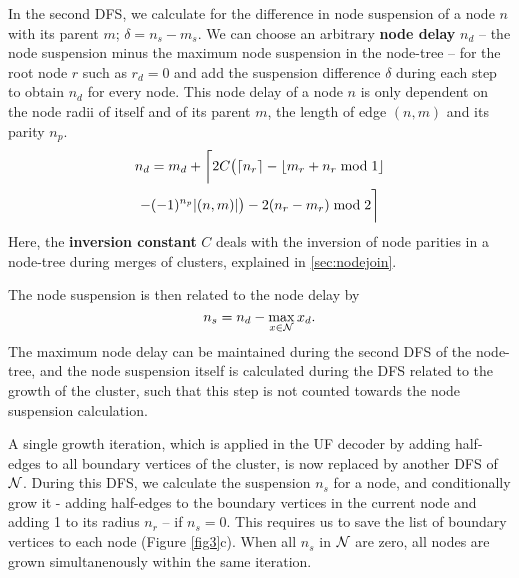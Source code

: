 In the second DFS, we calculate for the difference in node suspension of a node $n$ with its parent $m$; $\delta = n_s - m_s$. We can choose an arbitrary \textbf{node delay} $n_d$ -- the node suspension minus the maximum node suspension in the node-tree -- for the root node $r$ such as $r_d=0$ and add the suspension difference $\delta$ during each step to obtain $n_d$ for every node. This node delay of a node $n$ is only dependent on the node radii of itself and of its parent $m$, the length of edge $(n,m)$ and its parity $n_p$. 
\begin{multline}\label{eq:delayequation}
    n_d = m_d + \bigg \lceil 2C\big(\ceil{n_r} - \floor{m_r + n_r \bmod 1}\\
    - (-1)^{n_p}\abs{(n,m)}\big) - 2(n_r - m_r) \bmod2 \bigg \rceil
\end{multline}
Here, the \textbf{inversion constant} $C$ deals with the inversion of node parities in a node-tree during merges of clusters, explained in \ref{sec:nodejoin}. %

The node suspension is then related to the node delay by
\begin{equation*}
    n_s = n_d - \max_{x \in \mathcal{N}}{x_d}. 
\end{equation*}
The maximum node delay can be maintained during the second DFS of the node-tree, and the node suspension itself is calculated during the DFS related to the growth of the cluster, such that this step is not counted towards the node suspension calculation. 

A single growth iteration, which is applied in the UF decoder by adding half-edges to all boundary vertices of the cluster, is now replaced by another DFS of $\mathcal{N}$. During this DFS, we calculate the suspension $n_s$ for a node, and conditionally grow it - adding half-edges to the boundary vertices in the current node and adding 1 to its radius $n_r$ -- if $n_s = 0$. This requires us to save the list of boundary vertices to each node (Figure \ref{fig3}c). When all $n_s$ in $\mathcal{N}$ are zero, all nodes are grown simultanenously within the same iteration. 

